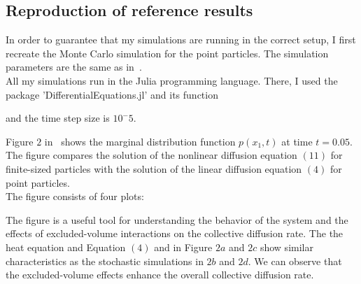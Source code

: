 \subsection{Reproduction of reference results}
In order to guarantee that my simulations are running in the correct setup, I first recreate the Monte Carlo simulation for the point particles. 
The simulation parameters are the same as in~\cite{Bruna2012}. \\
All my simulations run in the Julia programming language. 
There, I used the package 'DifferentialEquations.jl' and its function 

and the time step size is $10^-5$. 

Figure $2$ in~\cite{Bruna2012} shows the marginal distribution function $p(x_1, t)$ at time $t = 0.05$. 
The figure compares the solution of the nonlinear diffusion equation $(11)$ for finite-sized particles with the solution of the linear diffusion equation $(4)$ for point particles. \\
The figure consists of four plots:

The figure is a useful tool for understanding the behavior of the system and the effects of excluded-volume interactions on the collective diffusion rate.
The the heat equation and Equation $(4)$ and in Figure $2a$ and $2c$ show similar characteristics as the stochastic simulations in $2b$ and $2d$. 
We can observe that the excluded-volume effects enhance the overall collective diffusion rate.





